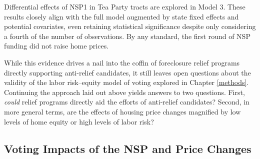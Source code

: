 \documentclass[12pt,oneside]{psthesis}
\begin{document}
Differential effects of NSP1 in Tea Party tracts are explored in Model 3.
These results closely align with the full model augmented by state fixed effects and potential covariates, even retaining statistical significance despite only considering a fourth of the number of observations.
By any standard, the first round of NSP funding did not raise home prices.

While this evidence drives a nail into the coffin of foreclosure relief programs directly supporting anti-relief candidates, it still leaves open questions about the validity of the labor risk--equity model of voting explored in Chapter \ref{methods}.
Continuing the approach laid out above yields answers to two questions.
First, \emph{could} relief programs directly aid the efforts of anti-relief candidates?
Second, in more general terms, are the effects of housing price changes magnified by low levels of home equity or high levels of labor risk?

\hypertarget{impacts}{%
\subsection{Voting Impacts of the NSP and Price Changes}\label{impacts}}
\end{document}
